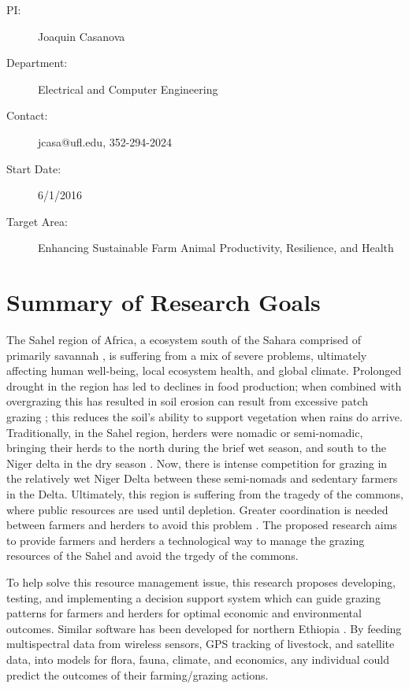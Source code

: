 \documentclass[11pt,letterpaper]{article}
\newcommand{\required}[1]{\section*{\hfil #1\hfil}}                    %
\begin{document}
\begin{description}
\item [PI:] Joaquin Casanova
\item [Department:] Electrical and Computer Engineering
\item [Contact:] jcasa@ufl.edu, 352-294-2024
\item [Start Date:] 6/1/2016
\item [Target Area:] Enhancing Sustainable Farm Animal Productivity, Resilience, and Health
\end{description}
\required{Summary of Research Goals}

The Sahel region of Africa, a ecosystem south of the Sahara comprised of primarily savannah \cite{wwf}, is suffering from a mix of severe problems, ultimately affecting human well-being, local ecosystem health, and global climate. Prolonged drought in the region has led to declines in food production; when combined with overgrazing this has resulted in soil erosion can result from excessive patch grazing \cite{coughenour1991spatial}; this reduces the soil's ability to support vegetation when rains do arrive. Traditionally, in the Sahel region, herders were nomadic or semi-nomadic, bringing their herds to the north during the brief wet season, and south to the Niger delta in the dry season \cite{coughenour1991spatial}. Now, there is intense competition for grazing in the relatively wet Niger Delta between these semi-nomads and sedentary farmers in the Delta. Ultimately, this region is suffering from the tragedy of the commons, where public resources are used until depletion. Greater coordination is needed between farmers and herders to avoid this problem \cite{breman1983rangeland}. The proposed research aims to provide farmers and herders a technological way to manage the grazing resources of the Sahel and avoid the trgedy of the commons.

To help solve this resource management issue, this research proposes developing, testing, and implementing a decision support system which can guide grazing patterns for farmers and herders for optimal economic and environmental outcomes. Similar software has been developed for northern Ethiopia \cite{dragan2003application}. By feeding multispectral data from  wireless sensors, GPS tracking of livestock, and satellite data, into models for flora, fauna, climate, and economics, any individual could predict the outcomes of their farming/grazing actions. 
\end{document}
